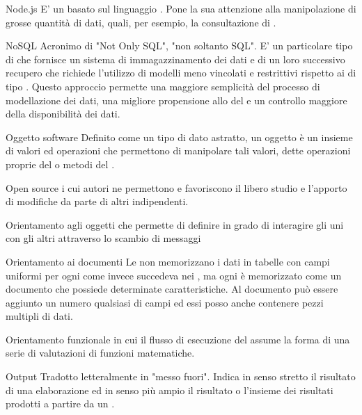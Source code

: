 
\elemento
{Node.js}
{E' un  basato sul linguaggio . Pone la sua attenzione alla manipolazione di grosse quantità di dati, quali, per esempio, la consultazione di .}

\elemento
{NoSQL}
{Acronimo di "Not Only SQL", "non soltanto SQL". E' un particolare tipo di  che fornisce un sistema di immagazzinamento dei dati e di un loro successivo recupero che richiede l'utilizzo di modelli meno vincolati e restrittivi rispetto ai  di tipo . Questo approccio permette una maggiore semplicità del processo di modellazione dei dati, una migliore propensione allo  del  e un controllo maggiore della disponibilità dei dati.}


\elemento
{Oggetto software}
{Definito come un tipo di dato astratto, un oggetto è un insieme di valori ed operazioni che permettono di manipolare tali valori, dette operazioni proprie del  o metodi del .}

\elemento
{Open source}
{ i cui autori ne permettono e favoriscono il libero studio e l'apporto di modifiche da parte di altri  indipendenti.}

\elemento
{Orientamento agli oggetti}
{ che permette di definire  in grado di interagire gli uni con gli altri attraverso lo scambio di messaggi}

\elemento
{Orientamento ai documenti}
{Le   non memorizzano i dati in tabelle con campi uniformi per ogni  come invece succedeva nei , ma ogni  è memorizzato come un documento che possiede determinate caratteristiche. Al documento può essere aggiunto un numero qualsiasi di campi ed essi posso anche contenere pezzi multipli di dati.}

\elemento
{Orientamento funzionale}
{ in cui il flusso di esecuzione del  assume la forma di una serie di valutazioni di funzioni matematiche.}

\elemento
{Output}
{Tradotto letteralmente in "messo fuori". Indica in senso stretto il risultato di una elaborazione ed in senso più ampio il risultato o l'insieme dei risultati prodotti a partire da un .}

